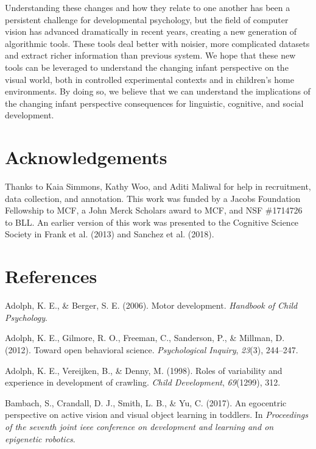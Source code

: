\documentclass[english,man]{apa6}
\begin{document}
Understanding these changes and how they relate to one another has been
a persistent challenge for developmental psychology, but the field of
computer vision has advanced dramatically in recent years, creating a
new generation of algorithmic tools. These tools deal better with
noisier, more complicated datasets and extract richer information than
previous system. We hope that these new tools can be leveraged to
understand the changing infant perspective on the visual world, both in
controlled experimental contexts and in children's home environments. By
doing so, we believe that we can understand the implications of the
changing infant perspective consequences for linguistic, cognitive, and
social development.

\section{Acknowledgements}\label{acknowledgements}

Thanks to Kaia Simmons, Kathy Woo, and Aditi Maliwal for help in
recruitment, data collection, and annotation. This work was funded by a
Jacobs Foundation Fellowship to MCF, a John Merck Scholars award to MCF,
and NSF \#1714726 to BLL. An earlier version of this work was presented
to the Cognitive Science Society in Frank et al. (2013) and Sanchez et
al. (2018).

\newpage

\section{References}\label{references}

\begingroup
\setlength{\parindent}{-0.5in} \setlength{\leftskip}{0.5in}

\hypertarget{refs}{}
\hypertarget{ref-adolph2006motor}{}
Adolph, K. E., \& Berger, S. E. (2006). Motor development.
\emph{Handbook of Child Psychology}.

\hypertarget{ref-adolph2012toward}{}
Adolph, K. E., Gilmore, R. O., Freeman, C., Sanderson, P., \& Millman,
D. (2012). Toward open behavioral science. \emph{Psychological Inquiry},
\emph{23}(3), 244--247.

\hypertarget{ref-adolph1998roles}{}
Adolph, K. E., Vereijken, B., \& Denny, M. (1998). Roles of variability
and experience in development of crawling. \emph{Child Development},
\emph{69}(1299), 312.

\hypertarget{ref-bambach2017}{}
Bambach, S., Crandall, D. J., Smith, L. B., \& Yu, C. (2017). An
egocentric perspective on active vision and visual object learning in
toddlers. In \emph{Proceedings of the seventh joint ieee conference on
development and learning and on epigenetic robotics}.
\end{document}
